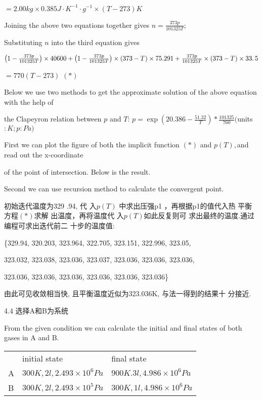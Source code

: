 \documentclass{ctexart}
\begin{document}
$=2.00\unit{kg}\times 0.385\unit{J}\cdot \unit{K}^{-1}\cdot \unit{g}%
^{-1}\times \left( T-273\right) \unit{K}$

Joining the above two equations together gives $n=\frac{373p}{101325T};$

Substituting $n$ into the third equation gives

$\left( 1-\frac{373p}{101325T}\right) \times 40600+\left( 1-\frac{373p}{%
101325T}\right) \times \left( 373-T\right) \times 75.291+\frac{373p}{101325T}%
\times \left( 373-T\right) \times \allowbreak 33.\,\allowbreak 5$

$=770\left( T-273\right) $ $\left( \ast \right) $

Below we use two methods to get the approximate solution of the above
equation with the help of

the Clapeyron relation between $p$ and $T$: $p=\exp \left( 20.386-\frac{51.32%
}{T}\right) \ast \frac{101325}{760}($units$:\unit{K};p:\unit{Pa})$

First we can plot the figure of both the implicit function $\left( \ast
\right) $ and $p\left( T\right) ,$and read out the x-coordinate \ \qquad\ \ 

of the point of intersection. Below is the result.


Second we can use recursion method to calculate the convergent point.

初始迭代温度为329 .94, 代%
入$p\left( T\right) $ 中求出压强p1%
，再根据p1的值代入热%
平衡方程$\left( \ast \right) $求解%
出温度，再将温度代%
入$p\left( T\right) $如此反复则可%
求出最终的温度.通过%
编程可求出迭代前二%
十步的温度值:

\{329.94, 320.203, 323.964, 322.705, 323.151, 322.996, 323.05,

323.032, 323.038, 323.036, 323.037, 323.036, 323.036, 323.036,

323.036, 323.036, 323.036, 323.036, 323.036, 323.036\}

由此可见收敛相当快,%
且平衡温度近似为323.036K,%
与法一得到的结果十%
分接近.

4.4 选择A和B为系统

From the given condition we can calculate the initial and final states of
both gases in A and B.

\begin{tabular}{lll}
& initial state & final state \\ 
A & $300\unit{K},2\unit{l},2.493\times 10^{6}\unit{Pa}$ & $\allowbreak 900%
\unit{K}.3\unit{l},4.986\times 10^{6}\unit{Pa}$ \\ 
B & $300\unit{K},2\unit{l},2.493\times 10^{5}\unit{Pa}$ & $300\unit{K},1%
\unit{l},4.986\times 10^{6}\unit{Pa}$%
\end{tabular}
\end{document}
